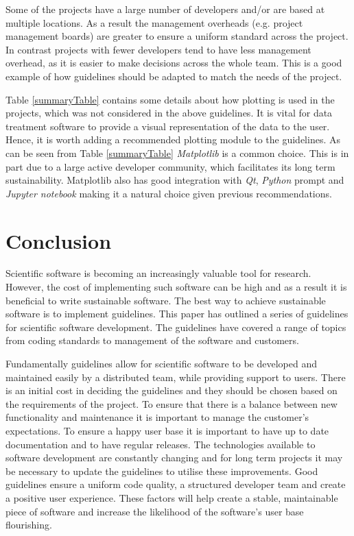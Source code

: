 \documentclass[jnr]{iosart2x}
\begin{document}
Some of the projects have a large number of developers and/or are based at multiple locations.
As a result the management overheads (e.g. project management boards) are greater to ensure a uniform standard across the project.
In contrast projects with fewer developers tend to have less management overhead, as it is easier to make decisions across the whole team.
This is a good example of how guidelines should be adapted to match the needs of the project.

Table \ref{summaryTable} contains some details about how plotting is used in the projects, which was not considered in the above guidelines.
It is vital for data treatment software to provide a visual representation of the data to the user.
Hence, it is worth adding a recommended plotting module to the guidelines.
As can be seen from Table \ref{summaryTable} {\it Matplotlib} is a common choice.
This is in part due to a large active developer community, which facilitates its long term sustainability.
Matplotlib also has good integration with {\it Qt}, {\it Python} prompt and {\it Jupyter notebook} making it a natural choice given previous recommendations.

\section{Conclusion}
\label{Conclusion}

Scientific software is becoming an increasingly valuable tool for research.
However, the cost of implementing such software can be high and as a result it is beneficial to write sustainable software.
The best way to achieve sustainable software is to implement guidelines.
This paper has outlined a series of guidelines for scientific software development.
The guidelines have covered a range of topics from coding standards to management of the software and customers.

Fundamentally guidelines allow for scientific software to be developed and maintained easily by a distributed team, while providing support to users.
There is an initial cost in deciding the guidelines and they should be chosen based on the requirements of the project.
To ensure that there is a balance between new functionality and maintenance it is important to manage the customer's expectations.
To ensure a happy user base it is important to have up to date documentation and to have regular releases.
The technologies available to software development are constantly changing and for long term projects it may be necessary to update the guidelines to utilise these improvements.
Good guidelines ensure a uniform code quality, a structured developer team and create a positive user experience.
These factors will help create a stable, maintainable piece of software and increase the likelihood of the software's user base flourishing.
\end{document}

